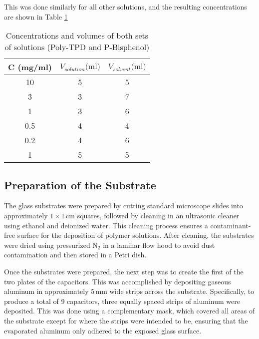 This was done similarly for all other solutions, and the resulting concentrations are shown in Table \ref{tab:solution-concentrations}

\begin{table}[]
	\caption{Concentrations and volumes of both sets of solutions (Poly-TPD and P-Bisphenol)}
\label{tab:solution-concentrations}
\begin{center}
\begin{tabular}{@{}ccc@{}}
\toprule
C (mg/ml) & $V_{solution}\text{(ml)}$ & $V_{solvent}\text{(ml)}$ \\ \midrule
10                    & 5           & 5          \\ \midrule
3                     & 3           & 7          \\ \midrule
1                     & 3           & 6          \\ \midrule
0.5                   & 4           & 4          \\ \midrule
0.2                   & 4           & 6          \\ \midrule
1                     & 5           & 5          \\ \bottomrule
\end{tabular}
\end{center}
\end{table}

\subsection{Preparation of the Substrate}

The glass substrates were prepared by cutting standard microscope slides into approximately $1 \times 1 \, \text{cm}$ squares, followed by cleaning in an ultrasonic cleaner using ethanol and deionized water. This cleaning process ensures a contaminant-free surface for the deposition of polymer solutions. After cleaning, the substrates were dried using pressurized $\text{N}_2$ in a laminar flow hood to avoid dust contamination and then stored in a Petri dish.

Once the substrates were prepared, the next step was to create the first of the two plates of the capacitors. This was accomplished by depositing gaseous aluminum in approximately $5 \, \text{mm}$ wide strips across the substrate. Specifically, to produce a total of 9 capacitors, three equally spaced strips of aluminum were deposited. This was done using a complementary mask, which covered all areas of the substrate except for where the strips were intended to be, ensuring that the evaporated aluminum only adhered to the exposed glass surface.

